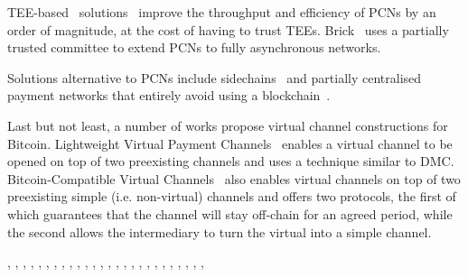   TEE-based~\cite{zhao2019sok}
  solutions~\cite{teechan,10.1145/3341301.3359627,liao2021speedster} improve the
  throughput and efficiency of PCNs by an order of magnitude, at the cost of
  having to trust TEEs. Brick~\cite{avarikioti2020brick} uses a partially
  trusted committee to extend PCNs to fully asynchronous networks.

  Solutions alternative to PCNs include sidechains~\cite{cryptoeprint:2020:175}
  and partially centralised payment networks that entirely avoid using a
  blockchain~\cite{DBLP:conf/trust/ArmknechtKMYZ15,stellar,silentwhispers,DBLP:conf/ndss/RoosMKG18}.

  Last but not least, a number of works propose virtual channel constructions
  for Bitcoin. Lightweight Virtual Payment
  Channels~\cite{10.1007/978-3-030-65411-5_18} enables a virtual channel to be
  opened on top of two preexisting channels and uses a technique similar to DMC.
  Bitcoin-Compatible Virtual Channels~\cite{cryptoeprint:2020:554} also enables
  virtual channels on top of two preexisting simple (i.e. non-virtual) channels
  and offers two protocols, the first of which guarantees that the channel will
  stay off-chain for an agreed period, while the second allows the intermediary
  to turn the virtual into a simple channel.

  \cite{DBLP:conf/fc/GudgeonMRMG20}, \cite{spider}, \cite{lightning},
  \cite{raiden}, \cite{bitcoin}, \cite{scaling}, \cite{decker},
  \cite{DBLP:conf/trust/ArmknechtKMYZ15}, \cite{stellar}, \cite{silentwhispers},
  \cite{DBLP:conf/ndss/RoosMKG18}, \cite{DBLP:conf/ccs/DziembowskiFH18},
  \cite{perun}, \cite{teechan}, \cite{sprites}, \cite{prihodko2016flare},
  \cite{DBLP:conf/ndss/MalavoltaMSKM19}, \cite{cryptoeprint:2020:175},
  \cite{cryptoeprint:2020:554}, \cite{cryptoeprint:2020:476},
  \cite{avarikioti2020brick}, \cite{10.1145/3319535.3345666},
  \cite{10.1007/978-3-030-65411-5_18}, \cite{cryptoeprint:2020:299},
  \cite{dong2018celer}, \cite{10.1145/3341301.3359627}, \cite{liao2021speedster}

